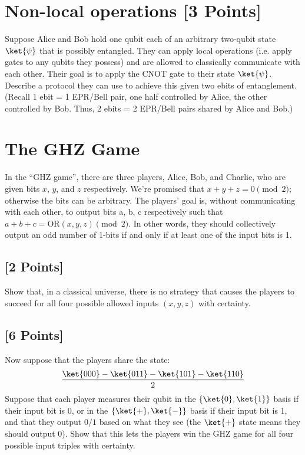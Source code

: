 \documentclass[11pt]{article}
\begin{document}
\section{Non-local operations [3 Points]} Suppose Alice and Bob hold one qubit each of an arbitrary two-qubit state $\ket{\psi}$ that is possibly entangled. They can apply local operations (i.e. apply gates to any qubits they possess) and are allowed to classically communicate with each other. Their goal is to apply the CNOT gate to their state $\ket{\psi}$. Describe a protocol they can use to achieve this given two ebits of entanglement. 
\\ (Recall 1 ebit = 1 EPR/Bell pair, one half controlled by Alice, the other controlled by Bob. Thus, 2 ebits = 2 EPR/Bell pairs shared by Alice and Bob.) 



\section{The GHZ Game} In the ``GHZ game'', there are three players, Alice, Bob, and
Charlie, who are given bits $x$, $y$, and $z$ respectively.  We're promised
that $x+y+z=0 \pmod{2}$; otherwise the bits can be arbitrary.  The
players' goal is, without communicating with each other, to output
bits a, b, c respectively such that
$a+b+c = \text{OR}(x,y,z) \pmod{2}$.
In other words, they should collectively output an odd number of 1-bits if and
only if at least one of the input bits is 1.

\subsection{[2 Points]} Show that, in a classical universe, there is no strategy that
causes the players to succeed for all four possible
allowed inputs $(x,y,z)$ with certainty.



\subsection{[6 Points]} Now suppose that the players share the state:
\[
\frac{\ket{000} - \ket{011} - \ket{101} - \ket{110}}{2}
\]
Suppose that each player measures their qubit in the $\{\ket{0}, \ket{1}\}$ basis if their input bit is 0, or in the $\{\ket{+}, \ket{-}\}$ basis if their input bit is 1, and that they output $0/1$ based on what they see (the $\ket{+}$ state means they should output $0$). Show that this lets the players win the GHZ game for all four possible input triples with certainty.
\end{document}
